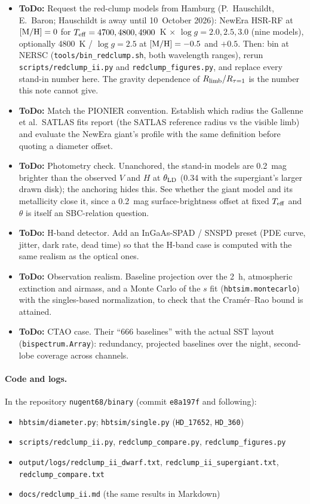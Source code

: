 \documentclass[11pt]{article}
\newcommand{\todo}[1]{\textcolor{red!70!black}{\textbf{ToDo:} #1}}
\begin{document}
\begin{itemize}
\item \todo{Request the red-clump models from Hamburg} (P.~Hauschildt,
  E.~Baron; Hauschildt is away until 10~October 2026): NewEra HSR-RF at
  $[{\rm M/H}] = 0$ for $T_{\rm eff} = 4700, 4800, 4900$~K $\times$
  $\log g = 2.0, 2.5, 3.0$ (nine models), optionally 4800~K /
  $\log g = 2.5$ at $[{\rm M/H}] = -0.5$ and $+0.5$. Then: bin at NERSC
  (\texttt{tools/bin\_redclump.sh}, both wavelength ranges), rerun
  \texttt{scripts/redclump\_ii.py} and \texttt{redclump\_figures.py},
  and replace every stand-in number here. The gravity dependence of
  $R_{\rm limb}/R_{\tau=1}$ is the number this note cannot give.
\item \todo{Match the PIONIER convention.} Establish which radius the
  Gallenne et al.\ SATLAS fits report (the SATLAS reference radius vs
  the visible limb) and evaluate the NewEra giant's profile with the
  same definition before quoting a diameter offset.
\item \todo{Photometry check.} Unanchored, the stand-in models are
  0.2~mag brighter than the observed $V$ and $H$ at $\theta_{\rm LD}$
  (0.34 with the supergiant's larger drawn disk); the anchoring hides
  this. See whether the giant model and its metallicity close it, since
  a 0.2~mag surface-brightness offset at fixed $T_{\rm eff}$ and
  $\theta$ is itself an SBC-relation question.
\item \todo{H-band detector.} Add an InGaAs-SPAD / SNSPD preset (PDE
  curve, jitter, dark rate, dead time) so that the H-band case is
  computed with the same realism as the optical ones.
\item \todo{Observation realism.} Baseline projection over the 2~h,
  atmospheric extinction and airmass, and a Monte Carlo of the $s$ fit
  (\texttt{hbtsim.montecarlo}) with the singles-based normalization, to
  check that the Cram\'er--Rao bound is attained.
\item \todo{CTAO case.} Their ``666 baselines'' with the actual SST
  layout (\texttt{bispectrum.Array}): redundancy, projected baselines
  over the night, second-lobe coverage across channels.
\end{itemize}

\paragraph{Code and logs.} In the repository \texttt{nugent68/binary}
(commit \texttt{e8a197f} and following):
\begin{itemize}\setlength{\itemsep}{0pt}
\item \texttt{hbtsim/diameter.py}; \texttt{hbtsim/single.py} (\texttt{HD\_17652}, \texttt{HD\_360})
\item \texttt{scripts/redclump\_ii.py}, \texttt{redclump\_compare.py}, \texttt{redclump\_figures.py}
\item \texttt{output/logs/redclump\_ii\_dwarf.txt}, \texttt{redclump\_ii\_supergiant.txt},\\ \texttt{redclump\_compare.txt}
\item \texttt{docs/redclump\_ii.md} (the same results in Markdown)
\end{itemize}
\end{document}

